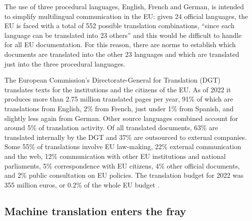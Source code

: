 \documentclass[output=paper]{langscibook}
\begin{document}
The use of three procedural languages, English, French and German, is intended to simplify multilingual communication in the EU: given 24 official languages, the EU is faced with a total of 552 possible translation combinations, “since each language can be translated into 23 others” \citep{EuropeanParliament2020} and this would be difficult to handle for all EU documentation. For this reason, there are norms to establish which documents are translated into the other 23 languages and which are translated just into the three procedural languages. 

The European Commission's Directorate-General for Translation (DGT) translates texts for the institutions and the citizens of the EU. As of 2022 it produces more than 2.75 million translated pages per year, 91\% of which are translations from English, 2\% from French, just under 1\% from Spanish, and slightly less again from German. Other source languages combined account for around 5\% of translation activity. Of all translated documents, 63\% are translated internally by the DGT and 37\% are outsourced to external companies. Some 55\% of translations involve EU law-making, 22\% external communication and the web, 12\% communication with other EU institutions and national parliaments, 5\% correspondence with EU citizens, 4\% other official documents, and 2\% public consultation on EU policies. The translation budget for 2022 was 355 million euros, or 0.2\% of the whole EU budget \citep{DGT2022}.\largerpage[2]

\subsection{Machine translation enters the fray}
\end{document}
